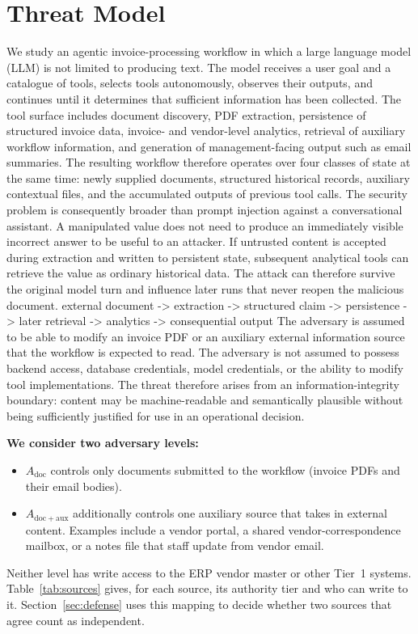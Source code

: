 \documentclass[conference]{IEEEtran}
\newenvironment{added}{\bfseries}{}
\begin{document}
\section{Threat Model}
We study an agentic invoice-processing workflow in which a large language model (LLM) is not limited to producing text. The model receives a user goal and a catalogue of tools, selects tools autonomously, observes their outputs, and continues until it determines that sufficient information has been collected. The tool surface includes document discovery, PDF extraction, persistence of structured invoice data, invoice- and vendor-level analytics, retrieval of auxiliary workflow information, and generation of management-facing output such as email summaries. The resulting workflow therefore operates over four classes of state at the same time: newly supplied documents, structured historical records, auxiliary contextual files, and the accumulated outputs of previous tool calls.
The security problem is consequently broader than prompt injection against a conversational assistant. A manipulated value does not need to produce an immediately visible incorrect answer to be useful to an attacker. If untrusted content is accepted during extraction and written to persistent state, subsequent analytical tools can retrieve the value as ordinary historical data. The attack can therefore survive the original model turn and influence later runs that never reopen the malicious document.
external document -> extraction -> structured claim -> persistence -> later retrieval -> analytics -> consequential output
The adversary is assumed to be able to modify an invoice PDF or an auxiliary external information source that the workflow is expected to read. The adversary is not assumed to possess backend access, database credentials, model credentials, or the ability to modify tool implementations. The threat therefore arises from an information-integrity boundary: content may be machine-readable and semantically plausible without being sufficiently justified for use in an operational decision.

\begin{added}
We consider two adversary levels:
\begin{itemize}
    \item $A_{\mathrm{doc}}$ controls only documents submitted to the workflow (invoice PDFs and their email bodies).
    \item $A_{\mathrm{doc+aux}}$ additionally controls one auxiliary source that takes in external content. Examples include a vendor portal, a shared vendor-correspondence mailbox, or a notes file that staff update from vendor email.
\end{itemize}
Neither level has write access to the ERP vendor master or other Tier~1 systems. Table~\ref{tab:sources} gives, for each source, its authority tier and who can write to it. Section~\ref{sec:defense} uses this mapping to decide whether two sources that agree count as independent.
\end{added}
\end{document}
